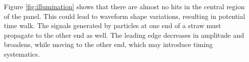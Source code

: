 Figure \ref{fig:illumination} 
shows that there are almost no hits in the central region of the panel. 
This could lead to waveform shape variations, resulting in potential time walk. The signals generated by 
particles at one end of a straw must propagate to the other end as well. 
The leading edge decreases in amplitude and broadens, while moving to 
the other end, which may introduce timing systematics.




